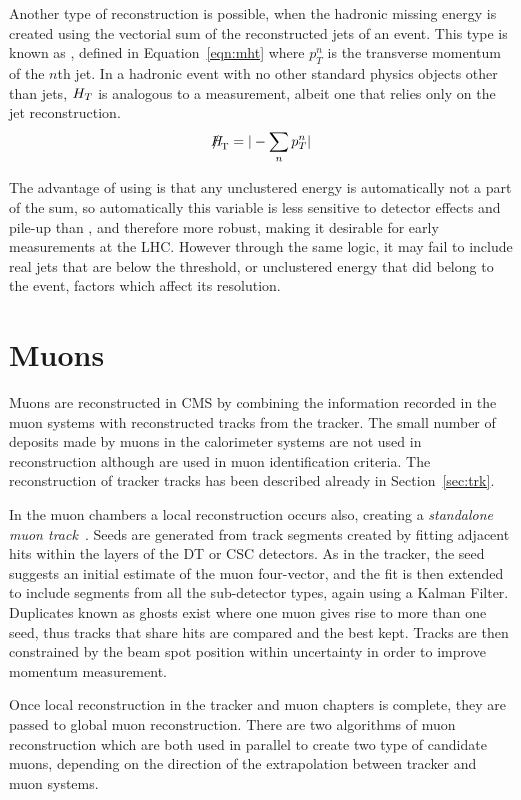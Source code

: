 Another type of \met reconstruction is possible, when the hadronic missing energy is created using the vectorial sum of the reconstructed jets of an event. This type is known as \MHT, defined in Equation~\ref{eqn:mht} where $p_{T}^{n}$ is the transverse momentum of the $n$th jet.  In a hadronic event with no other standard physics objects other than jets, $H_{T}$ is analogous to a \met measurement, albeit one that relies only on the jet reconstruction. 
\begin{equation}
\MHT = | - \sum_{n} p_{T}^{n}|
\label{eqn:mht}
\end{equation}

The advantage of using \MHT is that any unclustered energy is automatically not a part of the sum, so automatically this variable is less sensitive to detector effects and pile-up than \met, and therefore more robust, making it desirable for early measurements at the LHC. However through the same logic, it may fail to include real jets that are below the threshold, or unclustered energy that did belong to the event, factors which affect its resolution. 

\section{Muons}
\label{sec:muona}
Muons are reconstructed in CMS by combining the information recorded in the muon systems with reconstructed tracks from the tracker. The small number of deposits made by muons in the calorimeter systems are not used in reconstruction although are used in muon identification criteria. The reconstruction of tracker tracks has been described already in Section~\ref{sec:trk}. 

In the muon chambers a local reconstruction occurs also, creating a \textit{standalone muon track}~\cite{muonperf}. Seeds are generated from track segments created by fitting adjacent hits within the layers of the DT or CSC detectors. As in the tracker, the seed suggests an initial estimate of the muon four-vector, and the fit is then extended to include segments from all the sub-detector types, again using a Kalman Filter. Duplicates known as ghosts exist where one muon gives rise to more than one seed, thus tracks that share hits are compared and the best kept. Tracks are then constrained by the beam spot position within uncertainty in order to improve momentum measurement. 

Once local reconstruction in the tracker and muon chapters is complete, they are passed to global muon reconstruction. There are two algorithms of muon reconstruction which are both used in parallel to create two type of candidate muons, depending on the direction of the extrapolation between tracker and muon systems. 

